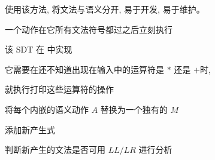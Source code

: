 \begin{frame}{}
  

  \pause
  \vspace{0.60cm}
  \begin{center}
     使用该方法, 将文法与语义分开, 易于开发, 易于维护。
  \end{center}
\end{frame}

\begin{frame}{}
  \begin{center}
     一个动作在它所有文法符号都过之后立刻执行

    \pause
    \vspace{0.30cm}

    \vspace{0.60cm}
  \end{center}
\end{frame}

\begin{frame}{}
  \begin{center}
    该 SDT 在  中实现


    \pause
    \vspace{0.50cm}
    它需要在还不知道出现在输入中的运算符是 $\ast$ 还是 $+$时,

    \vspace{0.30cm}
    就执行打印这些运算符的操作
  \end{center}
\end{frame}

\begin{frame}{}
  \begin{center}

    \pause
    \vspace{1.20cm}
    将每个内嵌的语义动作 $A$ 替换为一个独有的 $M$

    \vspace{0.60cm}
    添加新产生式 

    \vspace{0.60cm}
    判断新产生的文法是否可用 $LL/LR$ 进行分析
  \end{center}
\end{frame}

